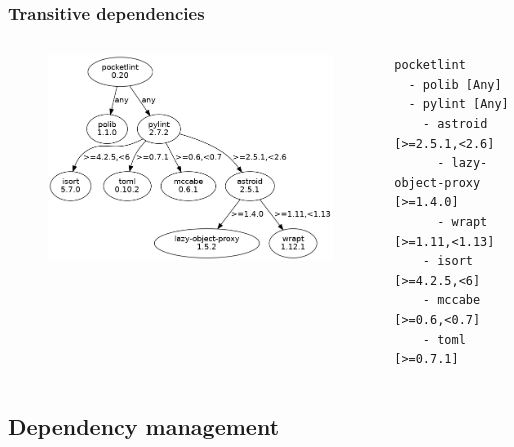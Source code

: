 \documentclass[aspectratio=169]{beamer}              %
\begin{document}
\begin{frame}[fragile]
	\frametitle{Transitive dependencies}
	
\begin{columns}
\begin{column}{0.5\textwidth}
	\begin{figure}[ht!]
	\begin{center}
  	  \includegraphics[width=\textwidth]{img/dependencies.png}
	\end{center}
	\end{figure}
\end{column}
\begin{column}{0.5\textwidth}
\begin{lstlisting}[frame=none, basicstyle=\ttfamily\small, escapechar=$, columns=fullflexible, keepspaces=true]
pocketlint
  - polib [Any]
  - pylint [Any]
    - astroid [>=2.5.1,<2.6]
      - lazy-object-proxy [>=1.4.0]
      - wrapt [>=1.11,<1.13]
    - isort [>=4.2.5,<6]
    - mccabe [>=0.6,<0.7]
    - toml [>=0.7.1]
\end{lstlisting}
\end{column}
\end{columns}
\end{frame}

\subsection{Dependency management}
\end{document}
